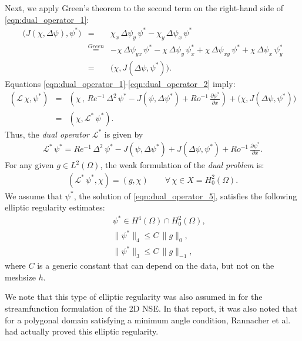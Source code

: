 Next, we apply Green's theorem to the second term on the right-hand side of \eqref{eqn:dual_operator_1}:
\begin{eqnarray}
\biggl( J(\chi , \Delta \psi) , \psi^* \biggr)
&=& \chi_x \, \Delta \psi_y \, \psi^*
   -    \chi_y \, \Delta \psi_x \, \psi^*
\nonumber \\
&\stackrel{Green}{=}&
- \chi \, \Delta \psi_{y x} \, \psi^*
- \chi \, \Delta \psi_y \, \psi^*_x
+ \chi \, \Delta \psi_{x y} \, \psi^*
+ \chi \, \Delta \psi_x \, \psi^*_y
\nonumber \\
&=& \biggl( \chi , J(\Delta \psi , \psi^*) \biggr) .
\label{eqn:dual_operator_2}
\end{eqnarray}
Equations \eqref{eqn:dual_operator_1}-\eqref{eqn:dual_operator_2} imply:
\begin{eqnarray}
(\mathcal{L} \, \chi , \psi^*)
&=& \left(
\chi \, , \,
Re^{-1} \, \Delta^2 \, \psi^*
- J(\psi , \Delta \psi^* )
+ Ro^{-1} \, \frac{\partial \psi^*}{\partial x}
\right)
+ \biggl( \chi , J(\Delta \psi , \psi^*) \biggr)
\nonumber \\
&=& ( \chi , \mathcal{L}^* \, \psi^*) .
\label{eqn:dual_operator_3}
\end{eqnarray}
Thus, the \emph{dual operator} $\mathcal{L}^*$ is given by
\begin{eqnarray}
\mathcal{L}^* \, \psi^*
= Re^{-1} \, \Delta^2 \, \psi^*
- J(\psi , \Delta \psi^* )
+ J(\Delta \psi , \psi^* )
+ Ro^{-1} \, \frac{\partial \psi^*}{\partial x} .
\label{eqn:dual_operator_4}
\end{eqnarray}
For any given $g \in L^2(\Omega)$, the weak formulation of the \emph{dual problem} is:
\begin{eqnarray}
( \mathcal{L}^* \, \psi^* , \chi )
= (g , \chi)
\qquad
\forall \, \chi \in X = H_0^2(\Omega) .
\label{eqn:dual_operator_5}
\end{eqnarray}
We assume that $\psi^*$, the solution of \eqref{eqn:dual_operator_5}, satisfies the following elliptic regularity estimates:
\begin{eqnarray}
&& \psi^* \in H^4(\Omega) \cap H^2_0(\Omega),
\label{eqn:dual_operator_6a} \\[0.2cm]
&& \| \psi^* \|_4
\le C \, \|g\|_{0},
\label{eqn:dual_operator_6b} \\[0.2cm]
&& \| \psi^* \|_3
\le C \, \|g\|_{-1},
\label{eqn:dual_operator_6c}
\end{eqnarray}
where $C$ is a generic constant that can depend on the data, but not on the meshsize $h$.
\begin{remark}
We note that this type of elliptic regularity was also assumed in \cite{Cayco86} for the streamfunction formulation of the 2D NSE.
In that report, it was also noted that for a polygonal domain satisfying a minimum angle condition, Rannacher et al. \cite{} had actually proved this elliptic regularity.
\end{remark}

